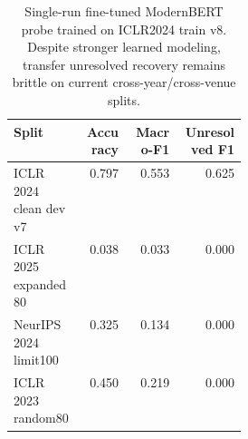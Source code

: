 \begin{table}[t]
\centering
\scriptsize
\setlength{\tabcolsep}{3pt}
\begin{tabular}{p{0.30\linewidth}rrr}
\toprule
Split & Accuracy & Macro-F1 & Unresolved F1 \\
\midrule
ICLR 2024 clean dev v7 & 0.797 & 0.553 & 0.625 \\
ICLR 2025 expanded80 & 0.038 & 0.033 & 0.000 \\
NeurIPS 2024 limit100 & 0.325 & 0.134 & 0.000 \\
ICLR 2023 random80 & 0.450 & 0.219 & 0.000 \\
\bottomrule
\end{tabular}
\caption{Single-run fine-tuned ModernBERT probe trained on ICLR2024 train v8. Despite stronger learned modeling, transfer unresolved recovery remains brittle on current cross-year/cross-venue splits.}
\label{tab:finetuned-modernbert-probe}
\end{table}
